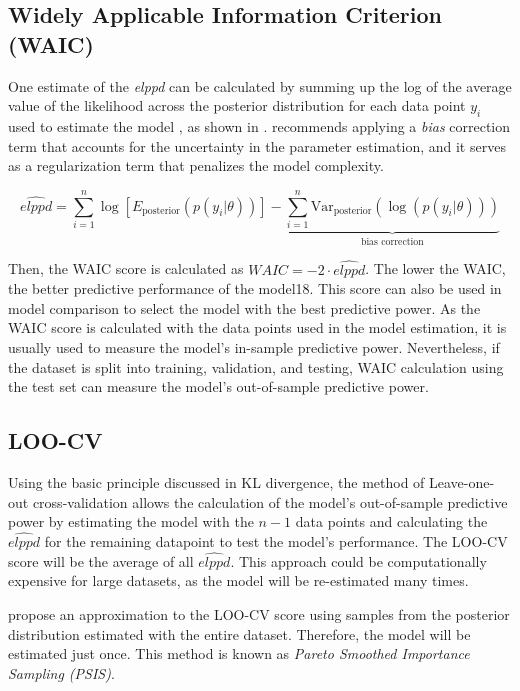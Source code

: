 \subsection{Widely Applicable Information Criterion (WAIC) }

One estimate of the \textit{elppd} can be calculated by summing up the log of the average value of the likelihood across the posterior distribution for each data point $y_i$ used to estimate the model \citep{Gelman2013}, as shown in . \citet{Gelman2013} recommends applying a \textit{bias} correction term that accounts for the uncertainty in the parameter estimation, and it serves as a regularization term that penalizes the model complexity.

\begin{equation}
    \widehat{elppd} = \sum_{i=1}^{n} \log \left[ E_{\text{posterior}}\left(p(y_i|\theta)\right) \right] - \underbrace{\sum_{i=1}^{n} \text{Var}_{\text{posterior}}\left(\log\left(p(y_i|\theta)\right)\right)}_{\text{bias correction}} \label{eq:WAIC}
\end{equation}

Then, the WAIC score is calculated as $WAIC= -2⋅ \widehat{elppd}$. The lower the WAIC, the better predictive performance of the model18. This score can also be used in model comparison to select the model with the best predictive power. As the WAIC score is calculated with the data points used in the model estimation, it is usually used to measure the model's in-sample predictive power. Nevertheless, if the dataset is split into training, validation, and testing, WAIC calculation using the test set can measure the model's out-of-sample predictive power.

\subsection{LOO-CV} 

Using the basic principle discussed in KL divergence, the method of Leave-one-out cross-validation allows the calculation of the model's out-of-sample predictive power by estimating the model with the $n-1$ data points and calculating the $\widehat{elppd}$ for the remaining datapoint to test the model's performance. The LOO-CV score will be the average of all $\widehat{elppd}$. This approach could be computationally expensive for large datasets, as the model will be re-estimated many times. 

\citet{Vehtari2015} propose an approximation to the LOO-CV score using samples from the posterior distribution estimated with the entire dataset. Therefore, the model will be estimated just once. This method is known as \textit{Pareto Smoothed Importance Sampling (PSIS)}. 

